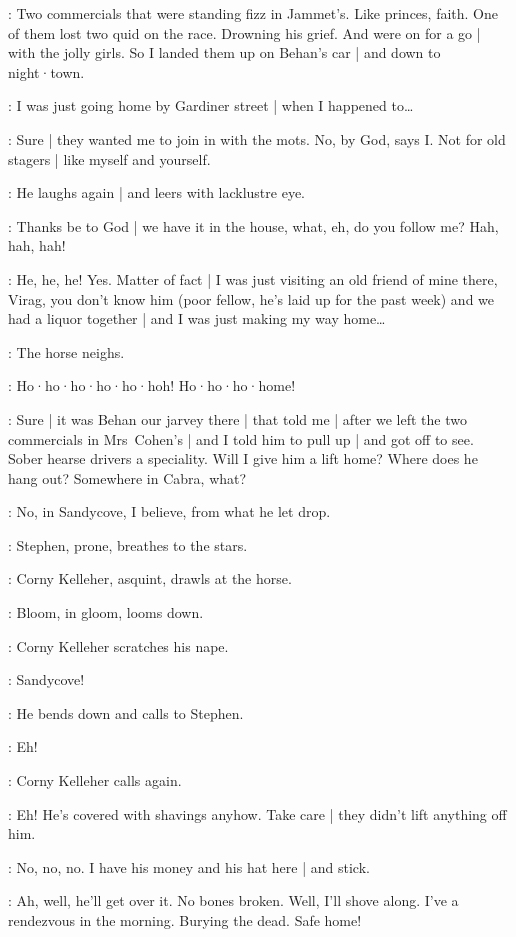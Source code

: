 \Corny:
Two commercials that were standing fizz in Jammet's.
Like princes,
faith.
One of them lost two quid on the race.
Drowning his grief.
And were on for a go |
with the jolly girls.
So I landed them up on Behan's car |
and down to night·town.

\Bloom:
I was just going home by Gardiner street |
when I happened to…

\Corny:
Sure |
they wanted me to join in with the mots.
No,
by God,
says I.
Not for old stagers |
like myself and yourself.

:
He laughs again |
and leers with lacklustre eye.

\Corny:
Thanks be to God |
we have it in the house,
what,
eh,
do you follow me?
Hah,
hah,
hah!

\Bloom:
He,
he,
he!
Yes.
Matter of fact |
I was just visiting an old friend of mine there,
Virag,
you don't know him
(poor fellow,
he's laid up for the past week)
and we had a liquor together |
and I was just making my way home…

:
The horse neighs.

\Horse:
Ho·ho·ho·ho·ho·hoh!
Ho·ho·ho·home!

\Corny:
Sure |
it was Behan our jarvey there |
that told me |
after we left the two commercials in Mrs~Cohen's |
and I told him to pull up |
and got off to see.
Sober hearse drivers a speciality.
Will I give him a lift home?
Where does he hang out?
Somewhere in Cabra,
what?

\Bloom:
No,
in Sandycove,
I believe,
from what he let drop.

:
Stephen,
prone,
breathes to the stars.

:
Corny Kelleher,
asquint,
drawls at the horse.

:
Bloom,
in gloom,
looms down.

:
Corny Kelleher scratches his nape.

\Corny:
Sandycove!

:
He bends down and calls to Stephen.

\Corny:
Eh!

:
Corny Kelleher calls again.

\Corny:
Eh!
He's covered with shavings anyhow.
Take care |
they didn't lift anything off him.

\Bloom:
No,
no,
no.
I have his money and his hat here |
and stick.

\Corny:
Ah,
well,
he'll get over it.
No bones broken.
Well,
I'll shove along.
I've a rendezvous in the morning.
Burying the dead.
Safe home!

